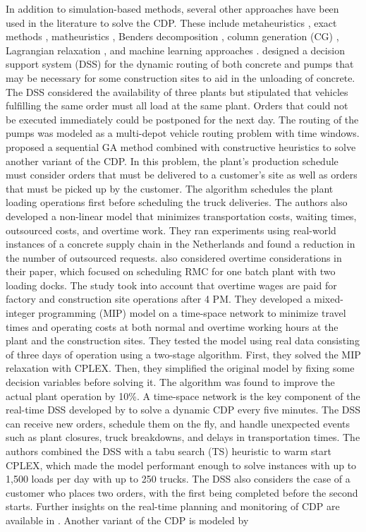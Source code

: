 \documentclass[]{article}
\begin{document}
In addition to simulation-based methods, several other approaches have been used in the literature to solve the CDP. These include metaheuristics \citep{ maghrebi2016sequential, yang2022concrete}, exact methods \citep{asbach2009analysis, kinable2014concrete}, matheuristics \citep{schmid2009hybrid, schmid2010hybridization}, Benders decomposition \citep{maghrebi2014benders}, column generation (CG) \citep{maghrebi2014solving}, Lagrangian relaxation \citep{narayanan2015using}, and machine learning approaches \citep{graham2006modeling}. \cite{matsatsinis2004towards} designed a decision support system (DSS) for the dynamic routing of both concrete and pumps that may be necessary for some construction sites to aid in the unloading of concrete. The DSS considered the availability of three plants but stipulated that vehicles fulfilling the same order must all load at the same plant. Orders that could not be executed immediately could be postponed for the next day. The routing of the pumps was modeled as a multi-depot vehicle routing problem with time windows. \cite{naso2007genetic} proposed a sequential GA method combined with constructive heuristics to solve another variant of the CDP. In this problem, the plant's production schedule must consider orders that must be delivered to a customer's site as well as orders that must be picked up by the customer. The algorithm schedules the plant loading operations first before scheduling the truck deliveries. The authors also developed a non-linear model that minimizes transportation costs, waiting times, outsourced costs, and overtime work. They ran experiments using real-world instances of a concrete supply chain in the Netherlands and found a reduction in the number of outsourced requests. \cite{yan2007optimal} also considered overtime considerations in their paper, which focused on scheduling RMC for one batch plant with two loading docks. The study took into account that overtime wages are paid for factory and construction site operations after 4 PM. They developed a mixed-integer programming (MIP) model on a time-space network to minimize travel times and operating costs at both normal and overtime working hours at the plant and the construction sites. They tested the model using real data consisting of three days of operation using a two-stage algorithm. First, they solved the MIP relaxation with CPLEX. Then, they simplified the original model by fixing some decision variables before solving it. The algorithm was found to improve the actual plant operation by 10\%. A time-space network is the key component of the real-time DSS developed by \cite{durbin2008or} to solve a dynamic CDP every five minutes. The DSS can receive new orders, schedule them on the fly, and handle unexpected events such as plant closures, truck breakdowns, and delays in transportation times. The authors combined the DSS with a tabu search (TS) heuristic to warm start CPLEX, which made the model performant enough to solve instances with up to 1,500 loads per day with up to 250 trucks. The DSS also considers the case of a customer who places two orders, with the first being completed before the second starts. Further insights on the real-time planning and monitoring of CDP are available in \cite{garza2021dynamic}. Another variant of the CDP is modeled by 
\end{document}
